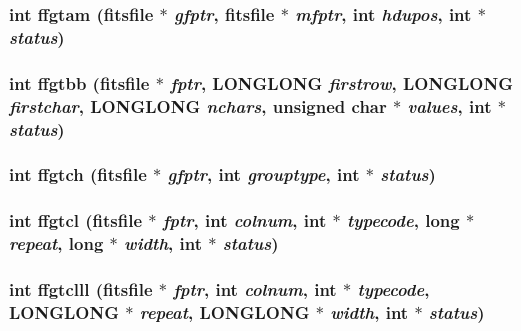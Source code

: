 \subsubsection{\setlength{\rightskip}{0pt plus 5cm}int ffgtam (\bf{fitsfile} $\ast$ {\em gfptr}, \bf{fitsfile} $\ast$ {\em mfptr}, int {\em hdupos}, int $\ast$ {\em status})}\label{src_2fitsio_8h_ae3ed6cd81ecb5001ff6abb808607eb3}


\subsubsection{\setlength{\rightskip}{0pt plus 5cm}int ffgtbb (\bf{fitsfile} $\ast$ {\em fptr}, \bf{LONGLONG} {\em firstrow}, \bf{LONGLONG} {\em firstchar}, \bf{LONGLONG} {\em nchars}, unsigned char $\ast$ {\em values}, int $\ast$ {\em status})}\label{src_2fitsio_8h_a5bbc15ac0a696cabe2c3b192161bdcc}


\subsubsection{\setlength{\rightskip}{0pt plus 5cm}int ffgtch (\bf{fitsfile} $\ast$ {\em gfptr}, int {\em grouptype}, int $\ast$ {\em status})}\label{src_2fitsio_8h_d96e000e88b7c66d74535f173ebe323a}


\subsubsection{\setlength{\rightskip}{0pt plus 5cm}int ffgtcl (\bf{fitsfile} $\ast$ {\em fptr}, int {\em colnum}, int $\ast$ {\em typecode}, long $\ast$ {\em repeat}, long $\ast$ {\em width}, int $\ast$ {\em status})}\label{src_2fitsio_8h_94467c6f6ab0cc865044556b263753a9}


\subsubsection{\setlength{\rightskip}{0pt plus 5cm}int ffgtclll (\bf{fitsfile} $\ast$ {\em fptr}, int {\em colnum}, int $\ast$ {\em typecode}, \bf{LONGLONG} $\ast$ {\em repeat}, \bf{LONGLONG} $\ast$ {\em width}, int $\ast$ {\em status})}\label{src_2fitsio_8h_6c74e11e1c017c8f4734409364b66557}


